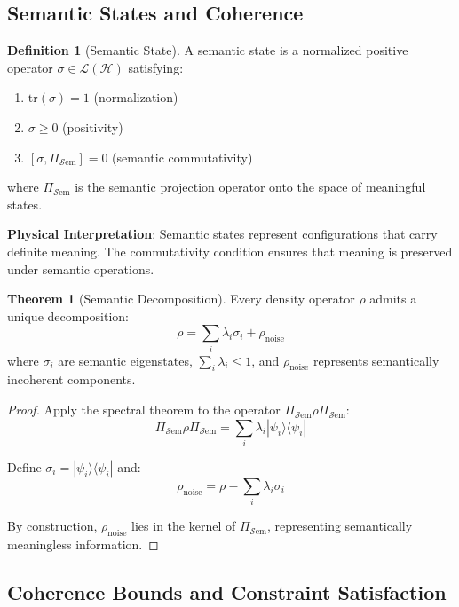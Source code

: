 \documentclass[11pt]{article}
\theoremstyle{definition}
\newtheorem{definition}{Definition}[section]
\newtheorem{theorem}{Theorem}[section]
\newcommand{\Hil}{\mathcal{H}}
\newcommand{\Sem}{\mathcal{S}\text{em}}
\newcommand{\tr}{\text{tr}}
\begin{document}
\subsection{Semantic States and Coherence}

\begin{definition}[Semantic State]
A semantic state is a normalized positive operator $\sigma \in \mathcal{L}(\Hil)$ satisfying:
\begin{enumerate}
\item $\tr(\sigma) = 1$ (normalization)
\item $\sigma \geq 0$ (positivity)
\item $[\sigma, \Pi_{\Sem}] = 0$ (semantic commutativity)
\end{enumerate}
where $\Pi_{\Sem}$ is the semantic projection operator onto the space of meaningful states.
\end{definition}

\textbf{Physical Interpretation}: Semantic states represent configurations that carry definite meaning. The commutativity condition ensures that meaning is preserved under semantic operations.

\begin{theorem}[Semantic Decomposition]
Every density operator $\rho$ admits a unique decomposition:
\begin{equation}
\rho = \sum_{i} \lambda_i \sigma_i + \rho_{\text{noise}}
\end{equation}
where $\sigma_i$ are semantic eigenstates, $\sum_i \lambda_i \leq 1$, and $\rho_{\text{noise}}$ represents semantically incoherent components.
\end{theorem}

\begin{proof}
Apply the spectral theorem to the operator $\Pi_{\Sem} \rho \Pi_{\Sem}$:
\begin{equation}
\Pi_{\Sem} \rho \Pi_{\Sem} = \sum_i \lambda_i |\psi_i\rangle\langle\psi_i|
\end{equation}

Define $\sigma_i = |\psi_i\rangle\langle\psi_i|$ and:
\begin{equation}
\rho_{\text{noise}} = \rho - \sum_i \lambda_i \sigma_i
\end{equation}

By construction, $\rho_{\text{noise}}$ lies in the kernel of $\Pi_{\Sem}$, representing semantically meaningless information.
\end{proof}

\subsection{Coherence Bounds and Constraint Satisfaction}
\end{document}
